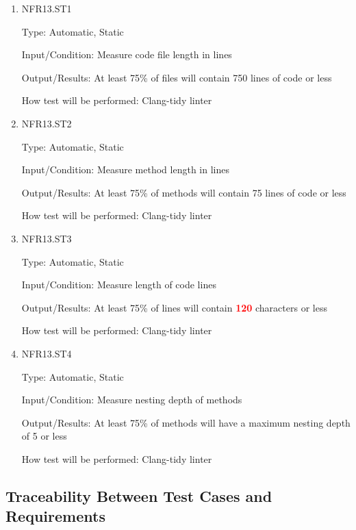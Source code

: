 \documentclass[12pt, titlepage]{article}
\begin{document}
\begin{enumerate}

\item{NFR13.ST1\\}

Type: Automatic, Static

Input/Condition: Measure code file length in lines

Output/Results: At least 75\% of files will contain 750 lines of code or less

How test will be performed: Clang-tidy linter

\item{NFR13.ST2\\}

Type: Automatic, Static

Input/Condition: Measure method length in lines

Output/Results: At least 75\% of methods will contain 75 lines of code or less

How test will be performed: Clang-tidy linter

\item{NFR13.ST3\\}

Type: Automatic, Static

Input/Condition: Measure length of code lines

Output/Results: At least 75\% of lines will contain \textcolor{red}{\bf 120} characters or less

How test will be performed: Clang-tidy linter

\item{NFR13.ST4\\}

Type: Automatic, Static

Input/Condition: Measure nesting depth of methods

Output/Results: At least 75\% of methods will have a maximum nesting depth of 5 or less

How test will be performed: Clang-tidy linter

\end{enumerate}

\subsection{Traceability Between Test Cases and Requirements}
\end{document}
